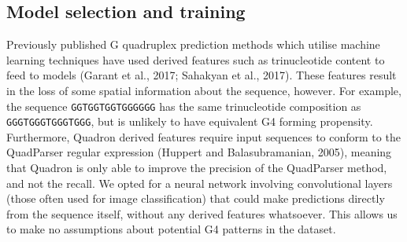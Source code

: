 \documentclass[12pt,a4paper,]{report}
\let\origfigure=\figure
\let\endorigfigure=\endfigure
\renewenvironment{figure}[1][2] {
    \expandafter\origfigure\expandafter[H]
} {
    \endorigfigure
}
\begin{document}
\begin{figure}[htbp]
\caption[Mismatch scores of candidate sequences identified by G4Hunter:]{\textbf{Mismatch   scores   of   candidate   sequences   identified   by   G4Hunter:}   \textbf{a)}   Histogram   of   log   percentage   mismatch   score   from   the   G4Seq   dataset,   for   the   50bp   sequences   identified   by   G4Hunter   (threshold   of   0.75).   Dashed   line   shows   the   threshold   chosen   to   delimit   G4   positive   and   G4   negative   sequences.   This   corresponded   to   around   20\%   mismatch   score.   \textbf{b)}   Joint   plot   of   log   mismatch   score   against   G4Hunter   score   for   10000   randomly   sampled   sequences.   Orange   line   shows   lowess   curve   fit.   \label{training_data}}
\end{figure}

\newpage

\hypertarget{model-selection-and-training}{%
\subsection{Model selection and
training}\label{model-selection-and-training}}

\label{ssec:results_model_choice}

Previously published G quadruplex prediction methods which utilise
machine learning techniques have used derived features such as
trinucleotide content to feed to models (Garant et al., 2017; Sahakyan
et al., 2017). These features result in the loss of some spatial
information about the sequence, however. For example, the sequence
\texttt{GGTGGTGGTGGGGGG} has the same trinucleotide composition as
\texttt{GGGTGGGTGGGTGGG}, but is unlikely to have equivalent G4 forming
propensity. Furthermore, Quadron derived features require input
sequences to conform to the QuadParser regular expression (Huppert and
Balasubramanian, 2005), meaning that Quadron is only able to improve the
precision of the QuadParser method, and not the recall. We opted for a
neural network involving convolutional layers (those often used for
image classification) that could make predictions directly from the
sequence itself, without any derived features whatsoever. This allows us
to make no assumptions about potential G4 patterns in the dataset.
\end{document}
